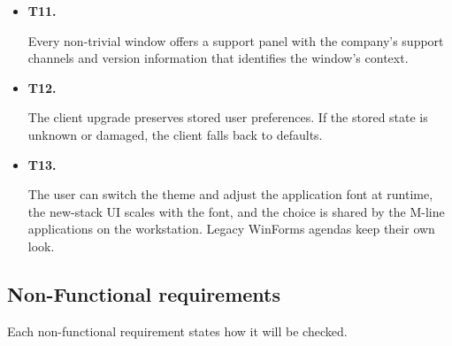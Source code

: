 \documentclass{article}
\newcommand{\reqdef}[1]{\hypertarget{req:#1}{\textbf{#1.}}}
\begin{document}
\begin{itemize}
  \item \reqdef{T11} Every non-trivial window offers a support panel with the company's support channels and version information that identifies the window's context.
  \item \reqdef{T12} The client upgrade preserves stored user preferences. If the stored state is unknown or damaged, the client falls back to defaults.
  \item \reqdef{T13} The user can switch the theme and adjust the application font at runtime, the new-stack UI scales with the font, and the choice is shared by the M-line applications on the workstation. Legacy WinForms agendas keep their own look.
\end{itemize}

\subsection{Non-Functional requirements}
\label{sec:nfr}

Each non-functional requirement states how it will be checked.
\end{document}
